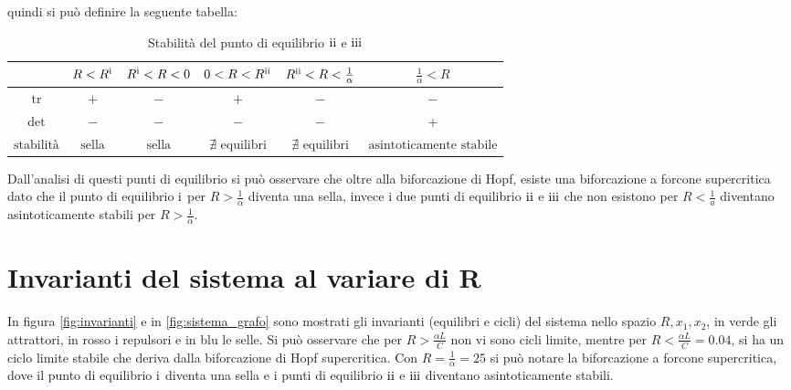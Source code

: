 \documentclass{article}
\newcommand{\rom}[1]{\uppercase\expandafter{\romannumeral #1\relax}}
\begin{document}
quindi si può definire la seguente tabella:

\begin{table}[h!]
    \centering
    \begin{tabular}{|c|c|c|c|c|c|}
        \hline
        $ $                & $R < R^\text{\rom{1}}$ & $R^\text{\rom{1}} < R < 0$ & $0 < R < R^\text{\rom{2}}$  & $R^\text{\rom{2}} < R < \frac{1}{\alpha}$ & $\frac{1}{\alpha} < R$           \\ \hline
        $\text{tr}$        & $+$                    & $-$                        & $+$                         & $-$                                       & $-$                              \\ \hline
        $\det$             & $-$                    & $-$                        & $-$                         & $-$                                       & $+$                              \\ \hline
        $\text{stabilità}$ & $\text{sella}$         & $\text{sella}$             & $\nexists\text{ equilibri}$ & $\nexists\text{ equilibri}$               & $\text{asintoticamente stabile}$ \\ \hline
    \end{tabular}
    \caption{Stabilità del punto di equilibrio \(\text{\rom{2}}\) e \(\text{\rom{3}}\)}
\end{table}

Dall'analisi di questi punti di equilibrio si può osservare che oltre alla biforcazione di Hopf, esiste una biforcazione a forcone supercritica dato che il punto di equilibrio \(\text{\rom{1}}\) per \(R > \frac{1}{\alpha}\) diventa una sella, invece i due punti di equilibrio \(\text{\rom{2}}\) e \(\text{\rom{3}}\) che non esistono per \(R < \frac{1}{a}\) diventano asintoticamente stabili per \(R > \frac{1}{\alpha}\).

\section{Invarianti del sistema al variare di R}

In figura \ref{fig:invarianti} e in \ref{fig:sistema_grafo} sono mostrati gli invarianti (equilibri e cicli) del sistema nello spazio \(R, x_1, x_2\), in verde gli attrattori, in rosso i repulsori e in blu le selle. Si può osservare che per \(R > \frac{\alpha L}{C}\) non vi sono cicli limite, mentre per \(R < \frac{\alpha L}{C} = 0.04 \), si ha un ciclo limite stabile che deriva dalla biforcazione di Hopf supercritica. Con \(R = \frac{1}{\alpha} = 25\) si può notare la biforcazione a forcone supercritica, dove il punto di equilibrio \(\text{\rom{1}}\) diventa una sella e i punti di equilibrio \(\text{\rom{2}}\) e \(\text{\rom{3}}\) diventano asintoticamente stabili.
\end{document}
